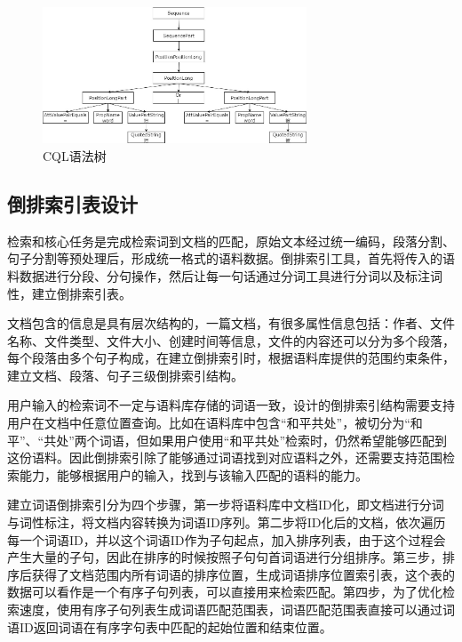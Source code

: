 \documentclass[11pt]{article}
\begin{document}
\begin{CJK*}{UTF8}{gbsn}
\begin{figure}[!h]
	\centering
	\includegraphics[width=0.7\textwidth]{image/yufashu.jpg}
	\caption{CQL语法树}
	\label{fig:yufashu}
\end{figure}

\subsection{倒排索引表设计}

检索和核心任务是完成检索词到文档的匹配，原始文本经过统一编码，段落分割、句子分割等预处理后，形成统一格式的语料数据。倒排索引工具，首先将传入的语料数据进行分段、分句操作，然后让每一句话通过分词工具进行分词以及标注词性，建立倒排索引表。

文档包含的信息是具有层次结构的，一篇文档，有很多属性信息包括：作者、文件名称、文件类型、文件大小、创建时间等信息，文件的内容还可以分为多个段落，每个段落由多个句子构成，在建立倒排索引时，根据语料库提供的范围约束条件，建立文档、段落、句子三级倒排索引结构。

用户输入的检索词不一定与语料库存储的词语一致，设计的倒排索引结构需要支持用户在文档中任意位置查询。比如在语料库中包含“和平共处”，被切分为“和平”、“共处”两个词语，但如果用户使用“和平共处”检索时，仍然希望能够匹配到这份语料。因此倒排索引除了能够通过词语找到对应语料之外，还需要支持范围检索能力，能够根据用户的输入，找到与该输入匹配的语料的能力。

建立词语倒排索引分为四个步骤，第一步将语料库中文档ID化，即文档进行分词与词性标注，将文档内容转换为词语ID序列。第二步将ID化后的文档，依次遍历每一个词语ID，并以这个词语ID作为子句起点，加入排序列表，由于这个过程会产生大量的子句，因此在排序的时候按照子句句首词语进行分组排序。第三步，排序后获得了文档范围内所有词语的排序位置，生成词语排序位置索引表，这个表的数据可以看作是一个有序子句列表，可以直接用来检索匹配。第四步，为了优化检索速度，使用有序子句列表生成词语匹配范围表，词语匹配范围表直接可以通过词语ID返回词语在有序字句表中匹配的起始位置和结束位置。


\end{CJK*}
\end{document}
